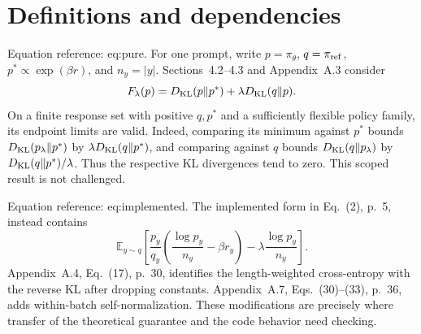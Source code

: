 \documentclass[10pt]{article}
\begin{document}
\section*{Definitions and dependencies}
Equation reference: eq:pure. For one prompt, write \(p=\pi_\theta\), \(q=\pi_{\rm ref}\), \(p^*\propto\exp(\beta r)\), and \(n_y=|y|\). Sections 4.2–4.3 and Appendix A.3 consider \[F_\lambda(p)=D_{\rm KL}(p\|p^*)+\lambda D_{\rm KL}(q\|p).
 \] On a finite response set with positive \(q,p^*\) and a sufficiently flexible policy family, its endpoint limits are valid. Indeed, comparing its minimum against \(p^*\) bounds \(D_{\rm KL}(p_\lambda\|p^*)\) by \(\lambda D_{\rm KL}(q\|p^*)\), and comparing against \(q\) bounds \(D_{\rm KL}(q\|p_\lambda)\) by \(D_{\rm KL}(q\|p^*)/\lambda\). Thus the respective KL divergences tend to zero. This scoped result is not challenged.\par
Equation reference: eq:implemented. The implemented form in Eq. (2), p. 5, instead contains \[\mathbb E_{y\sim q}
 \left[\frac{p_y}{q_y}\left(\frac{\log p_y}{n_y}-\beta r_y\right)
       -\lambda\frac{\log p_y}{n_y}\right].
 \] Appendix A.4, Eq. (17), p. 30, identifies the length-weighted cross-entropy with the reverse KL after dropping constants. Appendix A.7, Eqs. (30)–(33), p. 36, adds within-batch self-normalization. These modifications are precisely where transfer of the theoretical guarantee and the code behavior need checking.\par
\end{document}
